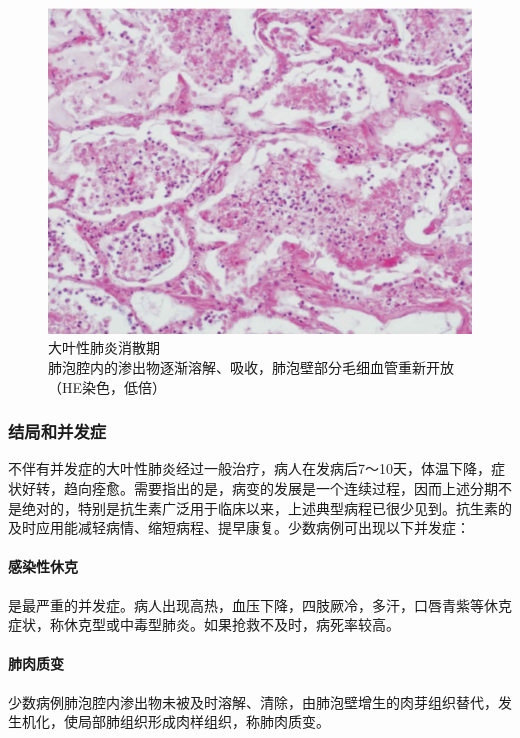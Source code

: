 \begin{figure}[!htbp]
 \centering
 \includegraphics{./images/Image00119.jpg}
 \captionsetup{justification=centering}
 \caption{大叶性肺炎消散期\\ {\small 肺泡腔内的渗出物逐渐溶解、吸收，肺泡壁部分毛细血管重新开放（HE染色，低倍）}}
\label{fig7-10}
  \end{figure}

\subsubsection{结局和并发症}

不伴有并发症的大叶性肺炎经过一般治疗，病人在发病后7～10天，体温下降，症状好转，趋向痊愈。需要指出的是，病变的发展是一个连续过程，因而上述分期不是绝对的，特别是抗生素广泛用于临床以来，上述典型病程已很少见到。抗生素的及时应用能减轻病情、缩短病程、提早康复。少数病例可出现以下并发症：

\paragraph{感染性休克}
是最严重的并发症。病人出现高热，血压下降，四肢厥冷，多汗，口唇青紫等休克症状，称休克型或中毒型肺炎。如果抢救不及时，病死率较高。

\paragraph{肺肉质变}
少数病例肺泡腔内渗出物未被及时溶解、清除，由肺泡壁增生的肉芽组织替代，发生机化，使局部肺组织形成肉样组织，称肺肉质变。


